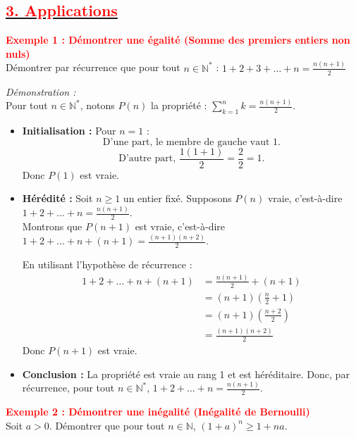 \documentclass[12pt,a4paper]{article}
\begin{document}
\subsection*{\underline{\textbf{\textcolor{red}{3. Applications}}}}

\textbf{\textcolor{red}{Exemple 1 : Démontrer une égalité (Somme des premiers entiers non nuls)}} \\
Démontrer par récurrence que pour tout $n \in \mathbb{N}^*$ : 
\( 1 + 2 + 3 + \dots + n = \frac{n(n+1)}{2} \)

\textit{Démonstration :} \\
Pour tout $n \in \mathbb{N}^*$, notons $P(n)$ la propriété : $\displaystyle \sum_{k=1}^n k = \frac{n(n+1)}{2}$.

\begin{itemize}
    \item \textbf{Initialisation :} Pour $n = 1$ :
    \[ \text{D'une part, le membre de gauche vaut } 1. \]
    \[ \text{D'autre part, } \frac{1(1+1)}{2} = \frac{2}{2} = 1. \]
    Donc $P(1)$ est vraie.

    \item \textbf{Hérédité :} Soit $n \ge 1$ un entier fixé. Supposons $P(n)$ vraie, c'est-à-dire $1 + 2 + \dots + n = \frac{n(n+1)}{2}$. \\
    Montrons que $P(n+1)$ est vraie, c'est-à-dire $1 + 2 + \dots + n + (n+1) = \frac{(n+1)(n+2)}{2}$.
    
    En utilisant l'hypothèse de récurrence :
    \begin{align*}
        1 + 2 + \dots + n + (n+1) &= \frac{n(n+1)}{2} + (n+1) \\
        &= (n+1) \left( \frac{n}{2} + 1 \right) \\
        &= (n+1) \left( \frac{n+2}{2} \right) \\
        &= \frac{(n+1)(n+2)}{2}
    \end{align*}
    Donc $P(n+1)$ est vraie.

    \item \textbf{Conclusion :} La propriété est vraie au rang 1 et est héréditaire. Donc, par récurrence, pour tout $n \in \mathbb{N}^*$, $1 + 2 + \dots + n = \frac{n(n+1)}{2}$.
\end{itemize}

\vspace{0.3cm}

\textbf{\textcolor{red}{Exemple 2 : Démontrer une inégalité (Inégalité de Bernoulli)}} \\
Soit $a > 0$. Démontrer que pour tout $n \in \mathbb{N}$, $(1+a)^n \ge 1 + na$.
\end{document}
